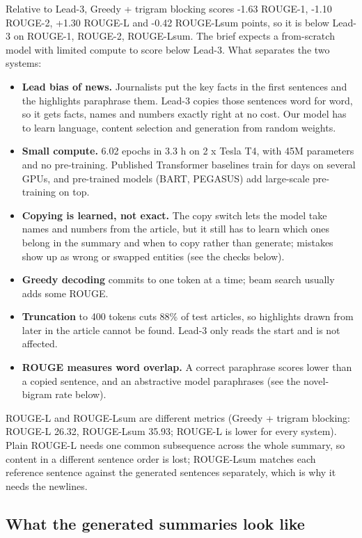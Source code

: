 \documentclass[10pt,a4paper]{article}
\providecommand{\tightlist}{\setlength{\itemsep}{0pt}\setlength{\parskip}{0pt}}
\begin{document}
Relative to Lead-3, Greedy + trigram blocking scores -1.63 ROUGE-1, -1.10 ROUGE-2, +1.30 ROUGE-L and -0.42 ROUGE-Lsum points, so it is below Lead-3 on ROUGE-1, ROUGE-2, ROUGE-Lsum. The brief expects a from-scratch model with limited compute to score below Lead-3. What separates the two systems:

\begin{itemize}
\tightlist
\item
  \textbf{Lead bias of news.} Journalists put the key facts in the first sentences and the highlights paraphrase them. Lead-3 copies those sentences word for word, so it gets facts, names and numbers exactly right at no cost. Our model has to learn language, content selection and generation from random weights.
\item
  \textbf{Small compute.} 6.02 epochs in 3.3 h on 2 x Tesla T4, with 45M parameters and no pre-training. Published Transformer baselines train for days on several GPUs, and pre-trained models (BART, PEGASUS) add large-scale pre-training on top.
\item
  \textbf{Copying is learned, not exact.} The copy switch lets the model take names and numbers from the article, but it still has to learn which ones belong in the summary and when to copy rather than generate; mistakes show up as wrong or swapped entities (see the checks below).
\item
  \textbf{Greedy decoding} commits to one token at a time; beam search usually adds some ROUGE.
\item
  \textbf{Truncation} to 400 tokens cuts 88\% of test articles, so highlights drawn from later in the article cannot be found. Lead-3 only reads the start and is not affected.
\item
  \textbf{ROUGE measures word overlap.} A correct paraphrase scores lower than a copied sentence, and an abstractive model paraphrases (see the novel-bigram rate below).
\end{itemize}

ROUGE-L and ROUGE-Lsum are different metrics (Greedy + trigram blocking: ROUGE-L 26.32, ROUGE-Lsum 35.93; ROUGE-L is lower for every system). Plain ROUGE-L needs one common subsequence across the whole summary, so content in a different sentence order is lost; ROUGE-Lsum matches each reference sentence against the generated sentences separately, which is why it needs the newlines.

\hypertarget{what-the-generated-summaries-look-like}{%
\subsection{What the generated summaries look like}\label{what-the-generated-summaries-look-like}}
\end{document}
